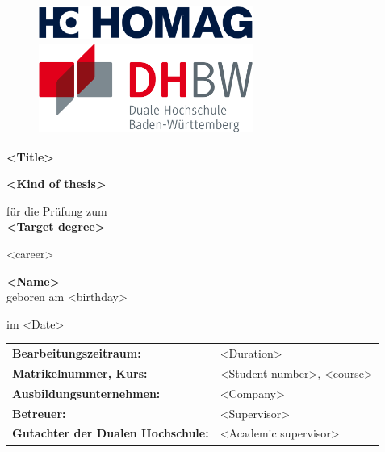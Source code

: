 \thispagestyle{empty}

\begin{figure}[h]
    \centering
    \begin{minipage}{0.45\linewidth}
        \centering
        \includegraphics[width=7cm]{Images/homag-group.png}
    \end{minipage}
    \hfill
    \begin{minipage}{0.45\linewidth}
        \centering
        \includegraphics[width=7cm, height=3cm]{Images/DHBW-Logo.png}
    \end{minipage}
\end{figure}

\begin{center}
    \Large{\textbf{<Title>}}\\[1,5cm]
\end{center}

\begin{center}
    \textbf{\Large{<Kind of thesis>}}\\[1,5cm]
\end{center}

\begin{center}
    \large{für die Prüfung zum \\
    \textbf{<Target degree>} \\[1cm]}
\end{center}

\begin{center}
    <career>\\ [1cm]
\end{center}

\begin{center}
    \large{\textbf{<Name>}} \\
    \small{geboren am <birthday>}\\[1cm]
\end{center}

\begin{center}
    \large{im <Date>} \\[1cm]
\end{center}

\begin{center}
    \begin{tabular}{ll}
        \textbf{Bearbeitungszeitraum:} & <Duration> \\
        \textbf{Matrikelnummer, Kurs:} & <Student number>, <course> \\
        \textbf{Ausbildungsunternehmen:} & <Company> \\
        \textbf{Betreuer:} & <Supervisor> \\
        \textbf{Gutachter der Dualen Hochschule:} & <Academic supervisor> 
    \end{tabular}
\end{center}